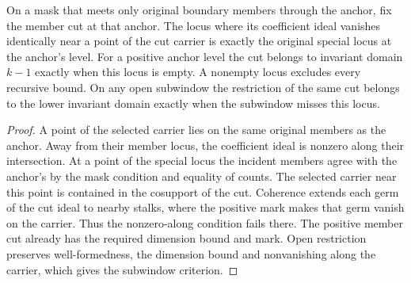 \begin{theorem}
\label{hir:g1-selected-domain-on-positive-mask}
\leanok
On a mask that meets only original boundary members through the
anchor, fix the member cut at that anchor. The locus where its
coefficient ideal vanishes identically near a point of the cut
carrier is exactly the original special locus at the anchor's
level. For a positive anchor level the cut belongs to invariant
domain $k-1$ exactly when this locus is empty. A nonempty locus
excludes every recursive bound. On any open subwindow the
restriction of the same cut belongs to the lower invariant
domain exactly when the subwindow misses this locus.
\end{theorem}
\begin{proof}
A point of the selected carrier lies on the same original
members as the anchor. Away from their member locus, the
coefficient ideal is nonzero along their intersection. At a
point of the special locus the incident members agree with
the anchor's by the mask condition and equality of counts.
The selected carrier near this point is contained in the
cosupport of the cut. Coherence extends each germ of the cut
ideal to nearby stalks, where the positive mark makes that
germ vanish on the carrier. Thus the nonzero-along condition
fails there. The positive member cut already has the required
dimension bound and mark. Open restriction preserves
well-formedness, the dimension bound and nonvanishing along
the carrier, which gives the subwindow criterion.
\end{proof}


